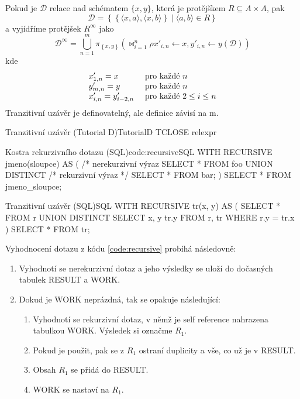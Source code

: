 Pokud je $\mathcal{D}$ relace nad schématem $\lbrace x, y \rbrace$, která je protějškem $R \subseteq A \times A$, pak
$$
\mathcal{D} = \left\{ \left\{ \langle x, a \rangle, \langle x, b \rangle \right\} \; | \; \langle a, b \rangle \in R \right\}
$$
a vyjídříme protějšek $R^{\infty}$ jako
$$
\mathcal{D}^{\infty} = \bigcup_{n = 1}^{m} \pi_{\left\{ x, y \right\}} \left( \Join_{i = 1}^{n} \rho x'_{i, n} \leftarrow x, y'_{i, n} \leftarrow y(\mathcal{D}) \right)
$$
kde
$$
\begin{array}{l l}
x'_{1, n} = x & \text{ pro každé } n \\
y'_{m, n} = y & \text{ pro každé } n \\
x'_{i, n} = y'_{i-2,n} & \text{ pro každé } 2 \leq i \leq n
\end{array}
$$
Tranzitivní uzávěr je definovatelný, ale definice závisí na m.
\begin{upcode}{Tranzitivní uzávěr (Tutorial D)}{}{TutorialD}
TCLOSE relexpr
\end{upcode}
\begin{upcode}{Kostra rekurzivního dotazu (SQL)}{code:recursive}{SQL}
WITH RECURSIVE jmeno(sloupce) AS (
	/* nerekurzivní výraz
	SELECT	*
	FROM	foo
	UNION	DISTINCT
	/* rekurzivní výraz */
	SELECT	*
	FROM 	bar;
)
SELECT	*
FROM	jmeno_sloupce;
\end{upcode}
\begin{upcode}{Tranzitivní uzávěr (SQL)}{}{SQL}
WITH RECURSIVE tr(x, y) AS (
	SELECT	*
	FROM 	r
	UNION	DISTINCT
	SELECT	x, y tr.y FROM r, tr
	WHERE	r.y = tr.x
)
SELECT * FROM tr;
\end{upcode}
Vyhodnocení dotazu z kódu \ref{code:recursive} probíhá následovně:
\begin{enumerate}
\item Vyhodnotí se nerekurzivní dotaz a jeho výsledky se uloží do dočasných tabulek RESULT a WORK.
\item Dokud je WORK neprázdná, tak se opakuje následující:
\begin{enumerate}
\item Vyhodnotí se rekurzivní dotaz, v němž je self reference nahrazena tabulkou WORK. Výsledek si označme $R_{1}$.
\item Pokud je použit, pak se z $R_{1}$ ostraní duplicity a vše, co už je v RESULT.
\item Obsah $R_{1}$ se přidá do RESULT.
\item WORK se nastaví na $R_{1}$.
\end{enumerate}
\end{enumerate}